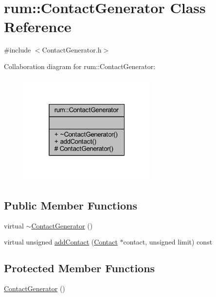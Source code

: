 \hypertarget{classrum_1_1_contact_generator}{}\section{rum\+:\+:Contact\+Generator Class Reference}
\label{classrum_1_1_contact_generator}


{\ttfamily \#include $<$Contact\+Generator.\+h$>$}



Collaboration diagram for rum\+:\+:Contact\+Generator\+:\nopagebreak
\begin{figure}[H]
\begin{center}
\leavevmode
\includegraphics[width=196pt]{classrum_1_1_contact_generator__coll__graph}
\end{center}
\end{figure}
\subsection*{Public Member Functions}
\begin{DoxyCompactItemize}
\item 
virtual \mbox{\hyperlink{classrum_1_1_contact_generator_acbd18056803ce7fd435a7a9505ce96ab}{$\sim$\+Contact\+Generator}} ()
\item 
virtual unsigned \mbox{\hyperlink{classrum_1_1_contact_generator_a10e14c5da23ed3fa91a6abac2f133b72}{add\+Contact}} (\mbox{\hyperlink{classrum_1_1_contact}{Contact}} $\ast$contact, unsigned limit) const
\end{DoxyCompactItemize}
\subsection*{Protected Member Functions}
\begin{DoxyCompactItemize}
\item 
\mbox{\hyperlink{classrum_1_1_contact_generator_a0c509abdf4d3eda20983e452d7c493c9}{Contact\+Generator}} ()
\end{DoxyCompactItemize}


